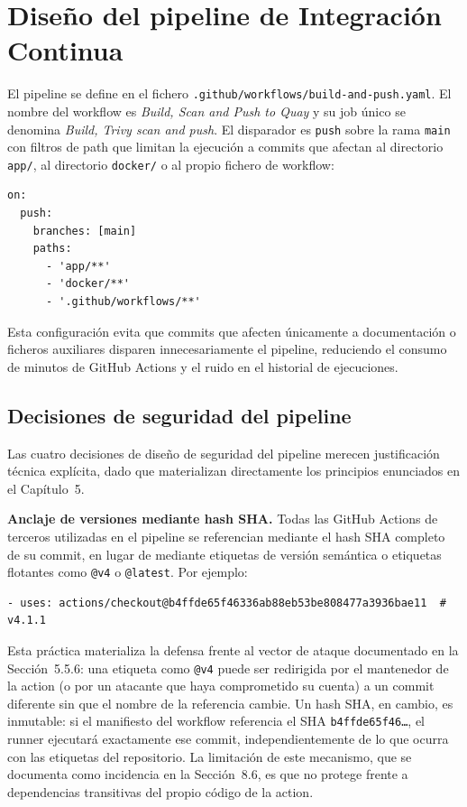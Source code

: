 \section{Diseño del pipeline de Integración Continua}
\label{sec:pipeline-design}

El pipeline se define en el fichero \texttt{.github/workflows/build-and-push.yaml}. El nombre del workflow es \textit{Build, Scan and Push to Quay} y su job único se denomina \textit{Build, Trivy scan and push}. El disparador es \texttt{push} sobre la rama \texttt{main} con filtros de path que limitan la ejecución a commits que afectan al directorio \texttt{app/}, al directorio \texttt{docker/} o al propio fichero de workflow:

\begin{lstlisting}
on:
  push:
    branches: [main]
    paths:
      - 'app/**'
      - 'docker/**'
      - '.github/workflows/**'
\end{lstlisting}

Esta configuración evita que commits que afecten únicamente a documentación o ficheros auxiliares disparen innecesariamente el pipeline, reduciendo el consumo de minutos de GitHub Actions y el ruido en el historial de ejecuciones.

\subsection{Decisiones de seguridad del pipeline}

Las cuatro decisiones de diseño de seguridad del pipeline merecen justificación técnica explícita, dado que materializan directamente los principios enunciados en el Capítulo~5.

\textbf{Anclaje de versiones mediante hash SHA.} Todas las GitHub Actions de terceros utilizadas en el pipeline se referencian mediante el hash SHA completo de su commit, en lugar de mediante etiquetas de versión semántica o etiquetas flotantes como \texttt{@v4} o \texttt{@latest}. Por ejemplo:

\begin{lstlisting}
- uses: actions/checkout@b4ffde65f46336ab88eb53be808477a3936bae11  # v4.1.1
\end{lstlisting}

Esta práctica materializa la defensa frente al vector de ataque documentado en la Sección~5.5.6: una etiqueta como \texttt{@v4} puede ser redirigida por el mantenedor de la action (o por un atacante que haya comprometido su cuenta) a un commit diferente sin que el nombre de la referencia cambie. Un hash SHA, en cambio, es inmutable: si el manifiesto del workflow referencia el SHA \texttt{b4ffde65f46\ldots}, el runner ejecutará exactamente ese commit, independientemente de lo que ocurra con las etiquetas del repositorio. La limitación de este mecanismo, que se documenta como incidencia en la Sección~8.6, es que no protege frente a dependencias transitivas del propio código de la action.

